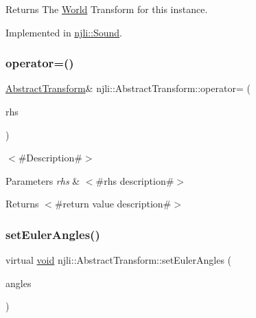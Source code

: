 \begin{DoxyReturn}{Returns}
The \mbox{\hyperlink{classnjli_1_1_world}{World}} Transform for this instance. 
\end{DoxyReturn}


Implemented in \mbox{\hyperlink{classnjli_1_1_sound_ac6e54aa0ca0c4e9893d9a78322f86dd3}{njli\+::\+Sound}}.

\mbox{\label{classnjli_1_1_abstract_transform_a33740ec533c3328faff5d702bcd36a16}} 
\subsubsection{\texorpdfstring{operator=()}{operator=()}}
{\footnotesize\ttfamily \mbox{\hyperlink{classnjli_1_1_abstract_transform}{Abstract\+Transform}}\& njli\+::\+Abstract\+Transform\+::operator= (\begin{DoxyParamCaption}\item[{const \mbox{\hyperlink{classnjli_1_1_abstract_transform}{Abstract\+Transform}} \&}]{rhs }\end{DoxyParamCaption})}

$<$\#\+Description\#$>$


\begin{DoxyParams}{Parameters}
{\em rhs} & $<$\#rhs description\#$>$\\
\hline
\end{DoxyParams}
\begin{DoxyReturn}{Returns}
$<$\#return value description\#$>$ 
\end{DoxyReturn}
\mbox{\label{classnjli_1_1_abstract_transform_a758c5d11698115dac64ec6e4ba29c5bb}} 
\subsubsection{\texorpdfstring{set\+Euler\+Angles()}{setEulerAngles()}}
{\footnotesize\ttfamily virtual \mbox{\hyperlink{_thread_8h_af1e856da2e658414cb2456cb6f7ebc66}{void}} njli\+::\+Abstract\+Transform\+::set\+Euler\+Angles (\begin{DoxyParamCaption}\item[{const bt\+Vector3 \&}]{angles }\end{DoxyParamCaption})\hspace{0.3cm}{\ttfamily [virtual]}}

